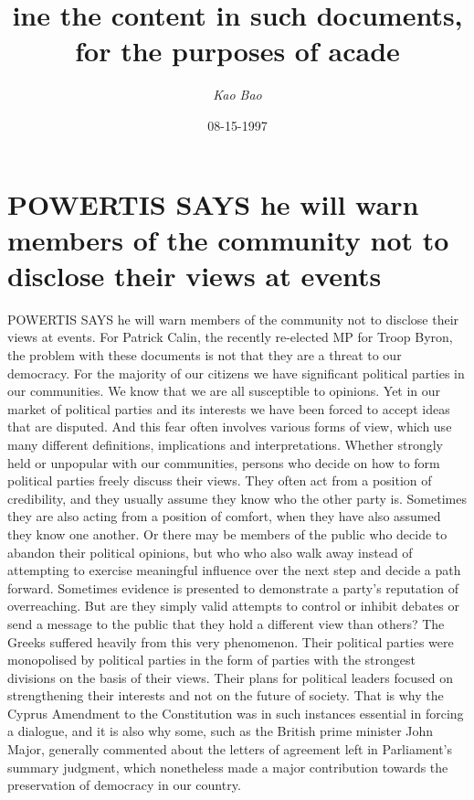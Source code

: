 \documentclass{article}%
\title{ine the content in such documents, for the purposes of acade}%
\author{\textit{Kao Bao}}%
\date{08-15-1997}%
\begin{document}
%
\normalsize%
\maketitle%
\section{POWERTIS SAYS he will warn members of the community not to disclose their views at events}%
\label{sec:POWERTISSAYShewillwarnmembersofthecommunitynottodisclosetheirviewsatevents}%
POWERTIS SAYS he will warn members of the community not to disclose their views at events.\newline%
For Patrick Calin, the recently re{-}elected MP for Troop Byron, the problem with these documents is not that they are a threat to our democracy. For the majority of our citizens we have significant political parties in our communities.\newline%
We know that we are all susceptible to opinions. Yet in our market of political parties and its interests we have been forced to accept ideas that are disputed. And this fear often involves various forms of view, which use many different definitions, implications and interpretations.\newline%
Whether strongly held or unpopular with our communities, persons who decide on how to form political parties freely discuss their views. They often act from a position of credibility, and they usually assume they know who the other party is.\newline%
Sometimes they are also acting from a position of comfort, when they have also assumed they know one another. Or there may be members of the public who decide to abandon their political opinions, but who who also walk away instead of attempting to exercise meaningful influence over the next step and decide a path forward.\newline%
Sometimes evidence is presented to demonstrate a party's reputation of overreaching. But are they simply valid attempts to control or inhibit debates or send a message to the public that they hold a different view than others?\newline%
The Greeks suffered heavily from this very phenomenon. Their political parties were monopolised by political parties in the form of parties with the strongest divisions on the basis of their views. Their plans for political leaders focused on strengthening their interests and not on the future of society.\newline%
That is why the Cyprus Amendment to the Constitution was in such instances essential in forcing a dialogue, and it is also why some, such as the British prime minister John Major, generally commented about the letters of agreement left in Parliament's summary judgment, which nonetheless made a major contribution towards the preservation of democracy in our country.\newline%
\end{document}

